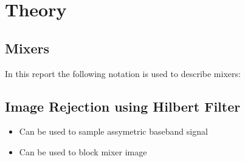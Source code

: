 \chapter{Theory}
\section{Mixers}
In this report the following notation is used to describe mixers:





\section{Image Rejection using Hilbert Filter}
\begin{itemize}
\item Can be used to sample assymetric baseband signal
\item Can be used to block mixer image
\end{itemize}
